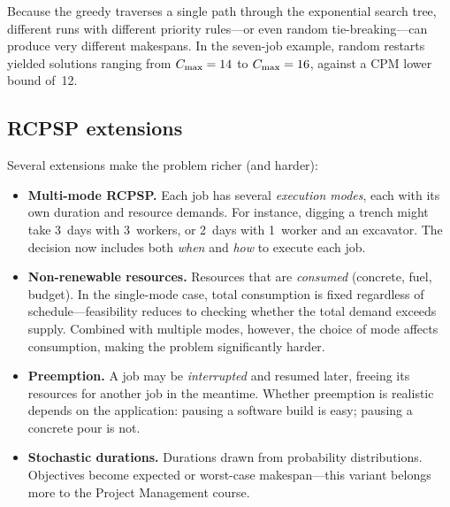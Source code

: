 \begin{remark}
Because the greedy traverses a single path through the exponential
search tree, different runs with different priority rules---or
even random tie-breaking---can produce very different makespans.
In the seven-job example, random restarts yielded solutions
ranging from $C_{\max} = 14$ to $C_{\max} = 16$, against a CPM lower
bound of~12.
\end{remark}

\subsection{RCPSP extensions}
\label{ssec:rcpsp-extensions}

Several extensions make the problem richer (and harder):

\begin{itemize}
  \item \textbf{Multi-mode RCPSP.}
    Each job has several \emph{execution modes}, each with its own
    duration and resource demands.
    For instance, digging a trench might take 3~days with
    3~workers, or 2~days with 1~worker and an excavator.
    The decision now includes both \emph{when} and \emph{how}
    to execute each job.

  \item \textbf{Non-renewable resources.}
    Resources that are \emph{consumed} (concrete, fuel, budget).
    In the single-mode case, total consumption is fixed regardless
    of schedule---feasibility reduces to checking whether the
    total demand exceeds supply.  Combined with multiple modes,
    however, the choice of mode affects consumption, making the
    problem significantly harder.

  \item \textbf{Preemption.}
    A job may be \emph{interrupted} and resumed later, freeing
    its resources for another job in the meantime.
    Whether preemption is realistic depends on the application:
    pausing a software build is easy; pausing a concrete pour
    is not.

  \item \textbf{Stochastic durations.}
    Durations drawn from probability distributions.
    Objectives become expected or worst-case makespan---this
    variant belongs more to the Project Management course.
\end{itemize}


